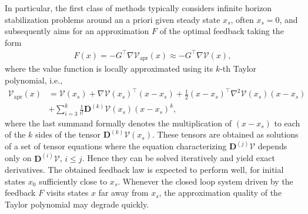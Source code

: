 \documentclass[11pt,reqno]{amsart}
\numberwithin{equation}{section}
\theoremstyle{plain}
\newcommand{\TenDeriv}[1]{\mathbf{D}^{(#1)}}
\begin{document}
In particular, the first class of methods typically considers infinite horizon stabilization problems around an a priori given steady state $x_s$, often $x_s=0$, and subsequently aims for an approximation $F$ of the optimal feedback taking the form
%
\begin{align}\label{eq:vf_approx_cont}
    F(x)
    =
    -G^\top \nabla \mathcal{V}_\mathrm{apr}(x)
    \approx
    -G^\top \nabla \mathcal{V}(x),
\end{align}
%
where the value function is locally approximated using its $k$-th Taylor polynomial, i.e.,
%
\begin{equation*}
\begin{aligned}
   \mathcal{V}_\mathrm{apr}(x)
    &=
    \mathcal{V}(x_s)
    +
    \nabla \mathcal{V}(x_s)^\top (x-x_s)
    +
    \frac{1}{2} (x-x_s)^\top \nabla^2 \mathcal{V}(x_s) (x-x_s)\\
    &+
    \sum_{i=3}^k \frac{1}{i!} \TenDeriv{k} \mathcal{V}(x_s) (x-x_s)^k,
\end{aligned}
\end{equation*}
%
where the last summand formally denotes the multiplication of $(x-x_s)$ to each of the $k$ sides of the tensor $\TenDeriv{k} \mathcal{V}(x_s)$.
These tensors are obtained as solutions of a set of tensor equations where the equation characterizing $\TenDeriv{j} \mathcal{V}$ depends only on $\TenDeriv{i} \mathcal{V}$, $i\leq j$. Hence they can be solved iteratively and yield exact derivatives. The obtained feedback law is expected to perform well, for initial states $x_0$ sufficiently close to $x_s$. Whenever the closed loop system driven by the feedback $F$ visits states $x$ far away from $x_s$, the approximation quality of the Taylor polynomial may degrade quickly.
\end{document}
